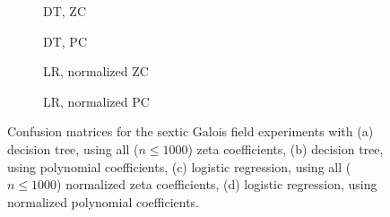 \documentclass[letterpaper, 10pt]{article}
\newcommand{\1}{\mathds{1}}	%
\theoremstyle{definition}
\theoremstyle{remark}
\begin{document}
\begin{figure}[h]
    \centering
    \begin{subfigure}[t]{0.23\textwidth}
        \centering
        \caption{DT, ZC}
        \label{fig:sextic_dt_zc}
    \end{subfigure}
    \hfill
    \begin{subfigure}[t]{0.23\textwidth}
        \centering
        \caption{DT, PC}
        \label{fig:sextic_dt_pc}
    \end{subfigure}
    \hfill
    \begin{subfigure}[t]{0.23\textwidth}
        \centering
        \caption{LR, normalized ZC}
        \label{fig:sextic_lr_zc_normalized}
    \end{subfigure}
    \hfill
    \begin{subfigure}[t]{0.23\textwidth}
        \centering
        \caption{LR, normalized PC}
        \label{fig:sextic_lr_pc_normalized}
    \end{subfigure}
    \caption{Confusion matrices for the sextic Galois field experiments with (a) decision tree, using all ($n \le 1000$) zeta coefficients, (b) decision tree, using polynomial coefficients, (c) logistic regression, using all ($n \le 1000$) normalized zeta coefficients, (d) logistic regression, using normalized polynomial coefficients.}
    \label{fig:galois_6_cm}
\end{figure}
\end{document}

